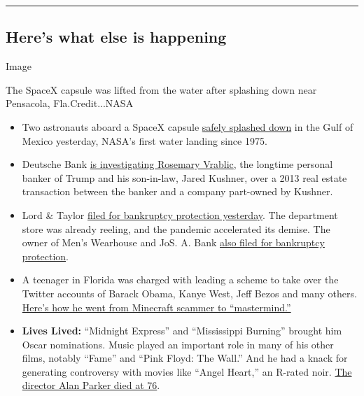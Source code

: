 \begin{center}\rule{0.5\linewidth}{\linethickness}\end{center}

\hypertarget{heres-what-else-is-happening}{%
\subsection{Here's what else is
happening}\label{heres-what-else-is-happening}}

Image

The SpaceX capsule was lifted from the water after splashing down near
Pensacola, Fla.Credit...NASA

\begin{itemize}
\item
  Two astronauts aboard a SpaceX capsule
  \href{https://www.nytimes.com/2020/08/02/science/spacex-astronauts-splashdown.html}{safely
  splashed down} in the Gulf of Mexico yesterday, NASA's first water
  landing since 1975.
\item
  Deutsche Bank
  \href{https://www.nytimes.com/2020/08/02/business/kushner-deutsche-trump-rosemary-vrablic.html}{is
  investigating Rosemary Vrablic}, the longtime personal banker of Trump
  and his son-in-law, Jared Kushner, over a 2013 real estate transaction
  between the banker and a company part-owned by Kushner.
\item
  Lord \& Taylor
  \href{https://www.nytimes.com/2020/08/02/business/Lord-and-Taylor-Bankruptcy.html}{filed
  for bankruptcy protection yesterday}. The department store was already
  reeling, and the pandemic accelerated its demise. The owner of Men's
  Wearhouse and JoS. A. Bank
  \href{https://www.nytimes.com/2020/08/03/business/tailored-brands-mens-wearhouse-bankruptcy.html}{also
  filed for bankruptcy protection}.
\item
  A teenager in Florida was charged with leading a scheme to take over
  the Twitter accounts of Barack Obama, Kanye West, Jeff Bezos and many
  others.
  \href{https://www.nytimes.com/2020/08/02/technology/florida-teenager-twitter-hack.html}{Here's
  how he went from Minecraft scammer to ``mastermind.''}
\item
  \textbf{Lives Lived:} ``Midnight Express'' and ``Mississippi Burning''
  brought him Oscar nominations. Music played an important role in many
  of his other films, notably ``Fame'' and ``Pink Floyd: The Wall.'' And
  he had a knack for generating controversy with movies like ``Angel
  Heart,'' an R-rated noir.
  \href{https://www.nytimes.com/2020/07/31/movies/alan-parker-versatile-film-director-is-dead-at-76.html}{The
  director Alan Parker died at 76}.
\end{itemize}

